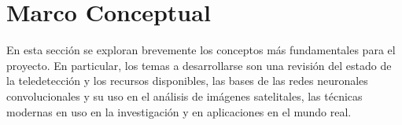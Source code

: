 \section{Marco Conceptual}

En esta sección se exploran brevemente los conceptos más fundamentales para el proyecto. En particular, los temas a
desarrollarse son una revisión del estado de la teledetección y los recursos disponibles, las bases de las redes
neuronales convolucionales y su uso en el análisis de imágenes satelitales, las técnicas modernas en uso en la
investigación y en aplicaciones en el mundo real.







